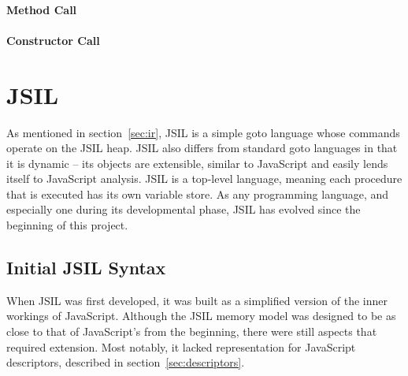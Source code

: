 \documentclass[a4paper,11pt,twoside]{report}
\begin{document}
\subsubsection{Method Call}
\subsubsection{Constructor Call}

\chapter{JSIL}\label{sec:jsil}
As mentioned in section~\ref{sec:ir}, JSIL is a simple goto language whose commands operate on the JSIL heap. JSIL also differs from standard goto languages in that it is dynamic -- its objects are extensible, similar to JavaScript and easily lends itself to JavaScript analysis. JSIL is a top-level language, meaning each procedure that is executed has its own variable store. As any programming language, and especially one during its developmental phase, JSIL has evolved since the beginning of this project. 

\section{Initial JSIL Syntax}
When JSIL was first developed, it was built as a simplified version of the inner workings of JavaScript. Although the JSIL memory model was designed to be as close to that of JavaScript's from the beginning, there were still aspects that required extension. Most notably, it lacked representation for JavaScript descriptors, described in section~\ref{sec:descriptors}.
\end{document}
